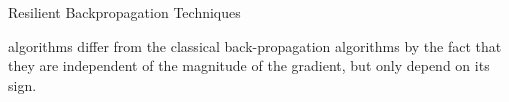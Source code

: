 \begin{chapter}{Resilient Backpropagation Techniques}
    \par {} algorithms differ from the classical back-propagation algorithms by the fact that they are independent of the magnitude of the gradient, but only depend on its sign.
    
    
    
\end{chapter}